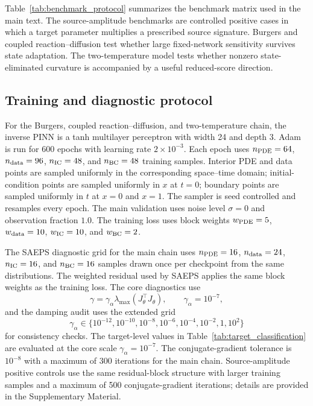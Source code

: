 \documentclass[preprint,12pt]{elsarticle}
\begin{document}
Table~\ref{tab:benchmark_protocol} summarizes the benchmark matrix used in the main text.  The source-amplitude benchmarks are controlled positive cases in which a target parameter multiplies a prescribed source signature.  Burgers and coupled reaction--diffusion test whether large fixed-network sensitivity survives state adaptation.  The two-temperature model tests whether nonzero state-eliminated curvature is accompanied by a useful reduced-score direction.



\subsection{Training and diagnostic protocol}

For the Burgers, coupled reaction--diffusion, and two-temperature chain, the inverse PINN is a tanh multilayer perceptron with width 24 and depth 3.  Adam is run for 600 epochs with learning rate $2\times10^{-3}$.  Each epoch uses $n_{\rm PDE}=64$, $n_{\rm data}=96$, $n_{\rm IC}=48$, and $n_{\rm BC}=48$ training samples.  Interior PDE and data points are sampled uniformly in the corresponding space--time domain; initial-condition points are sampled uniformly in $x$ at $t=0$; boundary points are sampled uniformly in $t$ at $x=0$ and $x=1$.  The sampler is seed controlled and resamples every epoch.  The main validation uses noise level $\sigma=0$ and observation fraction $1.0$.  The training loss uses block weights $w_{\rm PDE}=5$, $w_{\rm data}=10$, $w_{\rm IC}=10$, and $w_{\rm BC}=2$.

The SAEPS diagnostic grid for the main chain uses $n_{\rm PDE}=16$, $n_{\rm data}=24$, $n_{\rm IC}=16$, and $n_{\rm BC}=16$ samples drawn once per checkpoint from the same distributions.  The weighted residual used by SAEPS applies the same block weights as the training loss.  The core diagnostics use
\begin{equation}
    \gamma=\gamma_\alpha\lambda_{\max}(J_\theta^\top J_\theta),
    \qquad \gamma_\alpha=10^{-7},
\end{equation}
and the damping audit uses the extended grid
\[
\gamma_\alpha\in\{10^{-12},10^{-10},10^{-8},10^{-6},10^{-4},10^{-2},1,10^{2}\}
\]
for consistency checks.  The target-level values in Table~\ref{tab:target_classification} are evaluated at the core scale $\gamma_\alpha=10^{-7}$.  The conjugate-gradient tolerance is $10^{-8}$ with a maximum of 300 iterations for the main chain.  Source-amplitude positive controls use the same residual-block structure with larger training samples and a maximum of 500 conjugate-gradient iterations; details are provided in the Supplementary Material.
\end{document}

